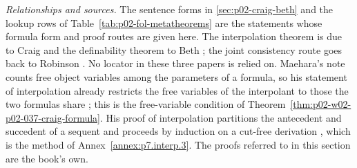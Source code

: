 \emph{Relationships and sources.}  The sentence forms in
\cref{sec:p02-craig-beth} and the lookup rows of
Table~\ref{tab:p02-fol-metatheorems} are the statements whose formula
form and proof routes are given here.  The interpolation theorem is due to
Craig \cite{Craig1957} and the definability theorem to Beth
\cite{Beth1953}; the joint consistency route goes back to Robinson
\cite{RobinsonJointConsistency1956}.  No locator in these three papers is
relied on.  Maehara's note \cite{Maehara1960} counts free object variables
among the parameters of a formula, so his statement of interpolation already
restricts the free variables of the interpolant to those the two formulas
share \cite[\S\S2--3, p.~236]{Maehara1960}; this is the free-variable
condition of Theorem~\ref{thm:p02-w02-p02-037-craig-formula}.  His proof
of interpolation partitions the antecedent and succedent of a sequent and
proceeds by induction on a cut-free derivation
\cite[\S5, pp.~236--237]{Maehara1960}, which is the method of
Annex~\ref{annex:p7.interp.3}.  The proofs referred to in this section are
the book's own.
